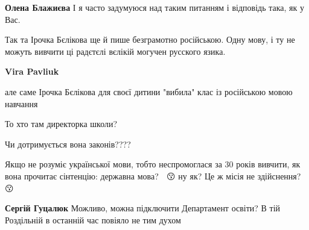 \begin{itemize}
\begin{itemize}
\textbf{Олена Блажиєва} І я часто задумуюся над таким питанням і відповідь така, як у Вас.
\end{itemize}

 
Так та Ірочка Бєлікова ще й пише безграмотно російською. Одну мову, і ту не
можуть вивчити ці радєтєлі вєлікій могучен русского язика.

\begin{itemize}
 
\textbf{Vira Pavliuk} 

але саме Ірочка Бєлікова для своєї дитини "вибила" клас із російською мовою навчання

То хто там директорка школи?

Чи дотримується вона законів????

 
Якщо не розуміє української мови, тобто неспромоглася за 30 років вивчити, як
вона прочитає сінтенцію: державна мова? 📝 😗 ну як? Це ж місія не здійснення?
📝 😗
\end{itemize}

 
\textbf{Сергій Гуцалюк}
Можливо, можна підключити Департамент освіти?
В тій Роздільній в останній час повіяло не тим духом

 

\end{itemize}
